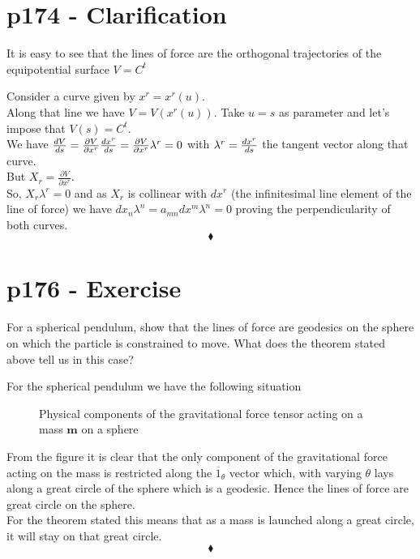 \section{p174 - Clarification}
\begin{tcolorbox}
It is easy to see that the lines of force are the orthogonal trajectories of the equipotential surface $V=C^{t}$
\end{tcolorbox}
Consider a curve given by $x^r=x^r\left(u\right)$. \\Along that line we have $V= V\left(x^r\left(u\right)\right)$. Take $u=s$ as parameter and let's impose that $V\left(s\right)= C^{t}$.\\ We have
$\dv{V}{s} = \frac{\partial{V}}{\partial{x^r}}\dv{x^r}{s} =\frac{\partial{V}}{\partial{x^r}}\lambda^r =0$ with $\lambda^r=\dv{x^r}{s}$ the tangent vector along that curve.\\ But $X_r = \frac{\partial{V}}{\partial{x^r}}$. \\
So, $X_r\lambda^r=0$ and as $X_r$ is collinear with $dx^r$ (the infinitesimal line element of the line of force) we have $dx_n \lambda^n = a_{mn}dx^m \lambda^n=0$ proving the perpendicularity of both curves.
$$\blacklozenge$$
\newpage

\section{p176 - Exercise}
\begin{tcolorbox}
For a spherical pendulum, show that the lines of force are geodesics on the sphere on which the particle is constrained to move. What does the theorem stated above tell us in this case?
\end{tcolorbox}
For the spherical pendulum we have the following situation
\begin{figure}[H]

\caption{Physical components of the gravitational force tensor acting on a mass $\mathbf{m}$ on a sphere }
\label{fig:fig_p176_Ex1}
\end{figure}
From the figure it is clear that the only component of the gravitational force acting on the mass is restricted along the $\overline{1}_{\theta}$ vector which, with varying $\theta$ lays along a great circle of the sphere which is a geodesic. Hence the lines of force are great circle on the sphere. \\
For the theorem stated this means that as a mass is launched along a great circle, it will stay on that great circle.
$$\blacklozenge$$
\newpage



